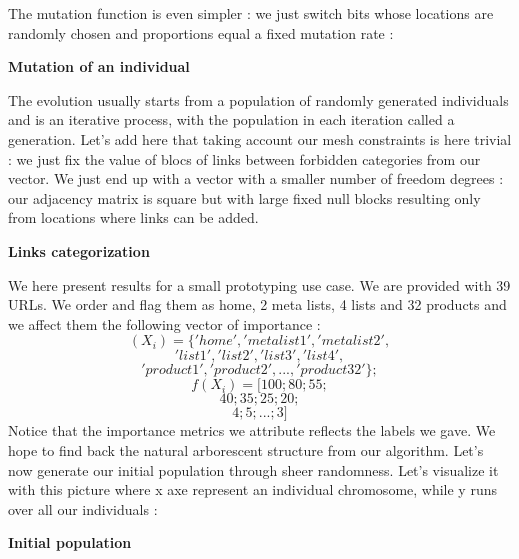 \documentclass{iSWAGArticle}
\begin{document}
\begin{center}
\end{center}
The mutation function is even simpler : we just switch bits whose locations are randomly chosen
and proportions equal a fixed mutation rate : 
\\\newline
\begin{center}
\textbf{\large Mutation of an individual}
\end{center}
\begin{center}
\end{center}
The evolution usually starts from a population of randomly generated individuals and is an iterative process, with the population in each iteration called a generation.
Let's add here that taking account our mesh constraints is here trivial : we just fix the value of blocs of links between forbidden categories from our
vector. We just end up with a vector with a smaller number of freedom degrees : our adjacency matrix is square but with large fixed null blocks resulting only from locations where links can be added.
\begin{center}
\textbf{\large Links categorization}
\end{center}
\begin{center}
\end{center}
We here present results for a small prototyping use case.
We are provided with 39 URLs. We order and flag them as home, 2 meta lists, 4 lists and 32 products and we affect them
the following vector of importance :
$$
\left(X_i\right)=\{'home','metalist1','metalist2',
$$
$$
'list1','list2','list3','list4',
$$
$$
'product1','product2',...,'product32'\};
$$
$$
f\left(X_i\right) = [100;80;55;$$
$$
40;35;25;20;
$$
$$
4;5;...;3]
$$
Notice that the importance metrics we attribute reflects the labels we gave. We hope to find back the natural arborescent structure from our algorithm.
Let's now generate our initial population through sheer randomness. Let's visualize it with this picture where x axe represent an individual chromosome, while y runs over all our individuals :
\begin{center}
\textbf{\large Initial population}
\end{center}
\begin{center}
\end{center}
\end{document}
